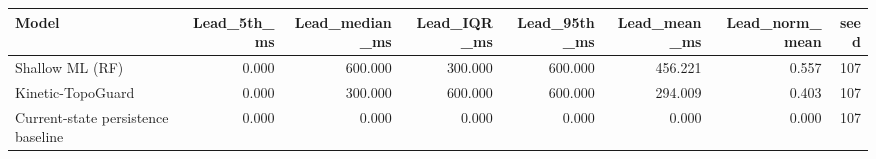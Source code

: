 \begin{tabular}{lrrrrrrr}
\toprule
Model & Lead\_5th\_ms & Lead\_median\_ms & Lead\_IQR\_ms & Lead\_95th\_ms & Lead\_mean\_ms & Lead\_norm\_mean & seed \\
\midrule
Shallow ML (RF) & 0.000 & 600.000 & 300.000 & 600.000 & 456.221 & 0.557 & 107 \\
Kinetic-TopoGuard & 0.000 & 300.000 & 600.000 & 600.000 & 294.009 & 0.403 & 107 \\
Current-state persistence baseline & 0.000 & 0.000 & 0.000 & 0.000 & 0.000 & 0.000 & 107 \\
\bottomrule
\end{tabular}